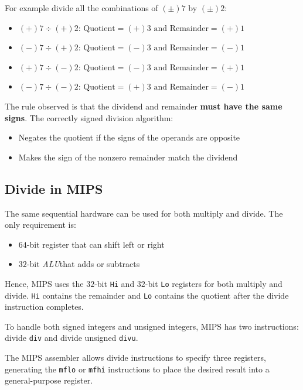 \documentclass[10pt,a4paper]{article}
\begin{document}
For example divide all the combinations of $(\pm) 7$ by $(\pm) 2$:
\begin{itemize}
    \item $(+)7 \div (+)2$: $\text{Quotient} = (+)3 \text{ and } \text{Remainder} = (+)1$
    \item $(-)7 \div (+)2$: $\text{Quotient} = (-)3 \text{ and } \text{Remainder} = (-)1$
    \item $(+)7 \div (-)2$: $\text{Quotient} = (-)3 \text{ and } \text{Remainder} = (+)1$
    \item $(-)7 \div (-)2$: $\text{Quotient} = (+)3 \text{ and } \text{Remainder} = (-)1$
\end{itemize}

The rule observed is that the dividend and remainder \textbf{must have the same signs}. The
correctly signed division algorithm:
\begin{itemize}
    \item Negates the quotient if the signs of the operands are opposite
    \item Makes the sign of the nonzero remainder match the dividend
\end{itemize} 

\subsection{Divide in MIPS}

The same sequential hardware can be used for both multiply and divide. The only requirement is:
\begin{itemize}
    \item $64$-bit register that can shift left or right
    \item $32$-bit \textit{ALU}that adds or subtracts
\end{itemize}

Hence, MIPS uses the $32$-bit \texttt{Hi} and $32$-bit \texttt{Lo} registers for both multiply and divide.
\texttt{Hi} contains the remainder and \texttt{Lo} contains the quotient after the divide
instruction completes.

To handle both signed integers and unsigned integers, MIPS has two instructions: divide \texttt{div}
and divide unsigned \texttt{divu}.  

The MIPS assembler allows divide instructions to specify three registers, generating the
\texttt{mflo} or \texttt{mfhi} instructions to place the desired result into a general-purpose register.
\end{document}
